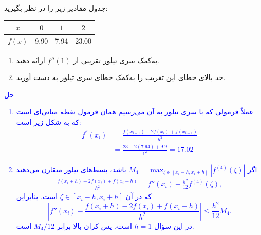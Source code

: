 \\
جدول مقادیر زیر را در نظر بگیرید:

\begin{latin}
\begin{table}[H]
  \begin{center}
    \begin{tabular}{c|c c c}
      \textbf{$x$} & $0$ & $1$ & $2$ \\
      \hline
      \textbf{$f(x)$} & 9.90 & 7.94 & 23.00 \\
    \end{tabular}
  \end{center}
\end{table}
\end{latin}

\begin{enumerate}
	\item
	به‌کمک سری تیلور تقریبی از
    $f''(1)$
    ارائه دهید.
	
	\item
	حد بالای خطای این تقریب را به‌کمک خطای سری تیلور به دست آورید.
\end{enumerate}
\textcolor{blue}{حل
\\
\begin{enumerate}
    \item
    عملاً فرمولی که با سری تیلور به آن می‌رسیم همان فرمول نقطه میانی‌ای است که به شکل زیر است:
    \begin{align*}
        f^{''}(x_i) &= \frac{f(x_{i + 1}) - 2f(x_i) + f(x_{i - 1})}{h^2} \\
        &= \frac{23 - 2 (7.94) + 9.9}{1^2} = 17.02
    \end{align*}
    \item
    اگر
    \(M_4=\max_{\xi\in[x_i-h,x_i+h]}|f^{(4)}(\xi)|\)
    باشد، بسط‌های تیلور متقارن می‌دهند
    \begin{align*}
        \frac{f(x_i+h)-2f(x_i)+f(x_i-h)}{h^2}
        =f''(x_i)+\frac{h^2}{12}f^{(4)}(\zeta),
    \end{align*}
    که در آن
    \(\zeta\in[x_i-h,x_i+h]\)
    است. بنابراین
    \[
        \left|f''(x_i)-\frac{f(x_i+h)-2f(x_i)+f(x_i-h)}{h^2}\right|
        \leq \frac{h^2}{12}M_4.
    \]
    در این سؤال \(h=1\) است، پس کران بالا برابر \(M_4/12\) است.
\end{enumerate}
}
